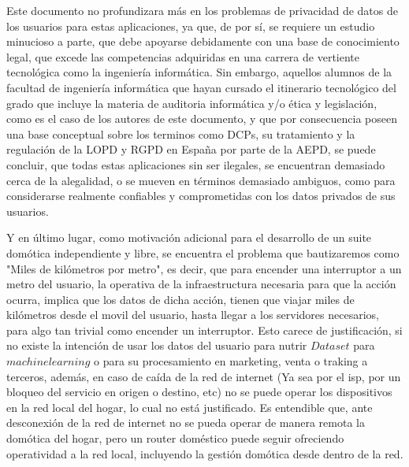 \vspace{1cm}

Este documento no profundizara más en los problemas de privacidad de datos de los usuarios para estas aplicaciones, ya que, de por sí, se requiere un estudio minucioso a parte, que debe apoyarse debidamente con una base de conocimiento legal, que excede las competencias adquiridas en una carrera de vertiente tecnológica como la ingeniería informática. Sin embargo, aquellos alumnos de la facultad de ingeniería informática que hayan cursado el itinerario tecnológico del grado que incluye la materia de auditoria informática y/o ética y legislación, como es el caso de los autores de este documento, y que por consecuencia poseen una base conceptual sobre los terminos como DCPs, su tratamiento y la regulación de la LOPD y RGPD en España por parte de la AEPD, se puede concluir, que todas estas aplicaciones sin ser ilegales, se encuentran demasiado cerca de la alegalidad, o se mueven en términos demasiado ambiguos, como para considerarse realmente confiables y comprometidas con los datos privados de sus usuarios.

\vspace{1cm}

Y en último lugar, como motivación adicional para el desarrollo de un suite domótica independiente y libre, se encuentra el problema que bautizaremos como "Miles de kilómetros por metro", es decir, que para encender una interruptor a un metro del usuario, la operativa de la infraestructura necesaria para que la acción ocurra, implica que los datos de dicha acción, tienen que viajar miles de kilómetros desde el movil del usuario, hasta llegar a los servidores necesarios, para algo tan trivial como encender un interruptor. Esto carece de justificación, si no existe la intención de usar los datos del usuario para nutrir $Dataset$ para $machine learning$ o para su procesamiento en marketing, venta o traking a terceros, además, en caso de caída de la red de internet (Ya sea por el \gls{isp}, por un bloqueo del servicio en origen o destino, etc) no se puede operar los dispositivos en la red local del hogar, lo cual no está justificado. Es entendible que, ante desconexión de la red de internet no se pueda operar de manera remota la domótica del hogar, pero un router doméstico puede seguir ofreciendo operatividad a la red local, incluyendo la gestión domótica desde dentro de la red.

\vspace{1cm}

